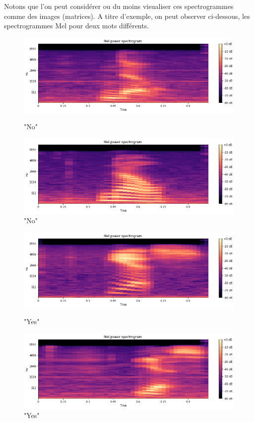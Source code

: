 \documentclass[12 pt, a4paper]{article}
\begin{document}
Notons que l'on peut considérer ou du moins visualiser ces spectrogrammes comme des images (matrices). A titre d'exemple, on peut observer ci-dessous, les spectrogrammes Mel pour deux mots différents.

\begin{figure}
   \begin{minipage}[c]{.46\linewidth}
      \includegraphics[scale=0.39]{no1.png}
      \caption{"No"}   
     \end{minipage} \hfill
   \begin{minipage}[c]{.46\linewidth}
      \includegraphics[scale=0.39]{no2.png}
      \caption{"No"}  
   \end{minipage}
\end{figure}

\begin{figure}
   \begin{minipage}[c]{.46\linewidth}
      \includegraphics[scale=0.39]{yes1.png}
      \caption{"Yes"}   
     \end{minipage} \hfill
   \begin{minipage}[c]{.46\linewidth}
      \includegraphics[scale=0.39]{yes2.png}
      \caption{"Yes"}  
   \end{minipage}
\end{figure}
\end{document}

